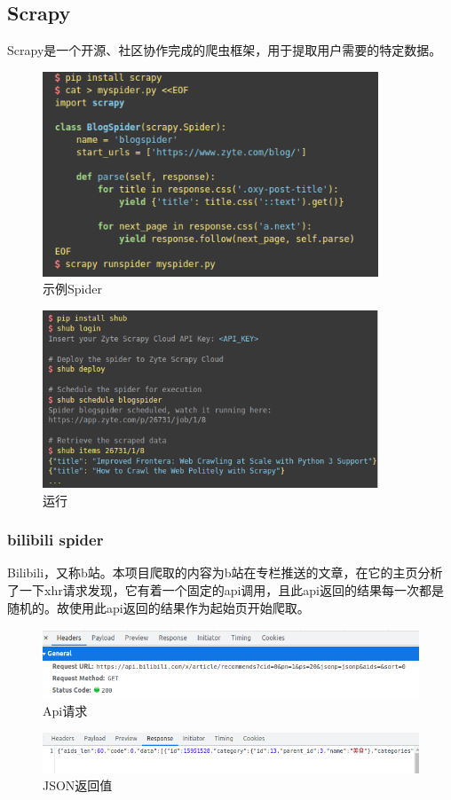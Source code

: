 \documentclass{article}
\begin{document}
\begin{CJK*}{UTF8}{gbsn}
\subsection{Scrapy}
Scrapy是一个开源、社区协作完成的爬虫框架，用于提取用户需要的特定数据。
\begin{figure}[H]
\centering
\includegraphics[width=10cm]{scrapy1.png}
\caption{示例Spider\cite{scrapy}}
\end{figure}
\begin{figure}[H]
\centering
\includegraphics[width=10cm]{scrapy2.png}
\caption{运行\cite{scrapy}}
\end{figure}

\subsubsection{bilibili spider}
Bilibili，又称b站。本项目爬取的内容为b站在专栏推送的文章，在它的主页分析了一下xhr请求发现，它有着一个固定的api调用，且此api返回的结果每一次都是随机的。故使用此api返回的结果作为起始页开始爬取。
\begin{figure}[H]
\centering
\includegraphics[width=14cm]{bili1.png}
\caption{Api请求}
\end{figure}
\begin{figure}[H]
\centering
\includegraphics[width=14cm]{bili2.png}
\caption{JSON返回值}
\end{figure}


\end{CJK*}
\end{document}
